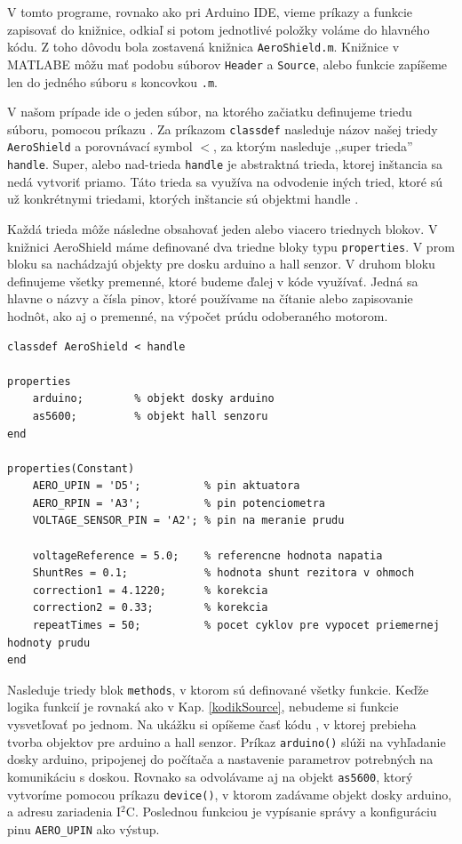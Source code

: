 V tomto programe, rovnako ako pri Arduino IDE, vieme príkazy a funkcie zapisovať do knižnice, odkiaľ si potom jednotlivé položky voláme do hlavného kódu. Z toho dôvodu bola zostavená knižnica \verb|AeroShield.m|. Knižnice v MATLABE môžu mať podobu súborov \verb|Header| a \verb|Source|, alebo funkcie zapíšeme len do jedného súboru s koncovkou \verb|.m|. 

V našom prípade ide o jeden súbor, na ktorého začiatku definujeme triedu súboru, pomocou príkazu . Za príkazom \verb|classdef| nasleduje názov našej triedy \verb|AeroShield| a porovnávací symbol $<$, za ktorým nasleduje ,,super trieda'' \verb|handle|. Super, alebo nad-trieda \verb|handle| je abstraktná trieda, ktorej inštancia sa nedá vytvoriť priamo. Táto trieda sa využíva na odvodenie iných tried, ktoré sú už konkrétnymi triedami, ktorých inštancie sú objektmi handle \cite{HANDLE}. 

Každá trieda môže následne obsahovať jeden alebo viacero triednych blokov. V knižnici AeroShield máme definované dva triedne bloky typu \verb|properties|. V prom bloku sa nachádzajú objekty pre dosku arduino a hall senzor. V druhom bloku definujeme všetky premenné, ktoré budeme ďalej v kóde využívať. Jedná sa hlavne o názvy a čísla pinov, ktoré používame na čítanie alebo zapisovanie hodnôt, ako aj o premenné, na výpočet prúdu odoberaného motorom. 

\begin{lstlisting}[caption={Knižnica AeroShield.m properties.},captionpos=b]
classdef AeroShield < handle

properties
	arduino;		% objekt dosky arduino 
	as5600;			% objekt hall senzoru
end

properties(Constant)
	AERO_UPIN = 'D5';          % pin aktuatora 
	AERO_RPIN = 'A3';          % pin potenciometra
	VOLTAGE_SENSOR_PIN = 'A2'; % pin na meranie prudu
	
	voltageReference = 5.0;    % referencne hodnota napatia 
	ShuntRes = 0.1;            % hodnota shunt rezitora v ohmoch
	correction1 = 4.1220;	   % korekcia  				  
	correction2 = 0.33;        % korekcia
	repeatTimes = 50;          % pocet cyklov pre vypocet priemernej hodnoty prudu 
end		
\end{lstlisting}
		
Nasleduje triedy blok \verb|methods|, v ktorom sú definované všetky funkcie. Keďže logika funkcií je rovnaká ako v Kap. \ref{kodikSource}, nebudeme si funkcie vysvetľovať po jednom. Na ukážku si opíšeme časť kódu , v ktorej prebieha tvorba objektov pre arduino a hall senzor. Príkaz \verb|arduino()| slúži na vyhľadanie dosky arduino, pripojenej do počítača a nastavenie parametrov potrebných na komunikáciu s doskou. Rovnako sa odvolávame aj na objekt \verb|as5600|, ktorý vytvoríme pomocou príkazu \verb|device()|, v ktorom zadávame objekt dosky arduino, a adresu zariadenia I$^2$C. Poslednou funkciou je vypísanie správy a konfiguráciu pinu \verb|AERO_UPIN| ako výstup. 

